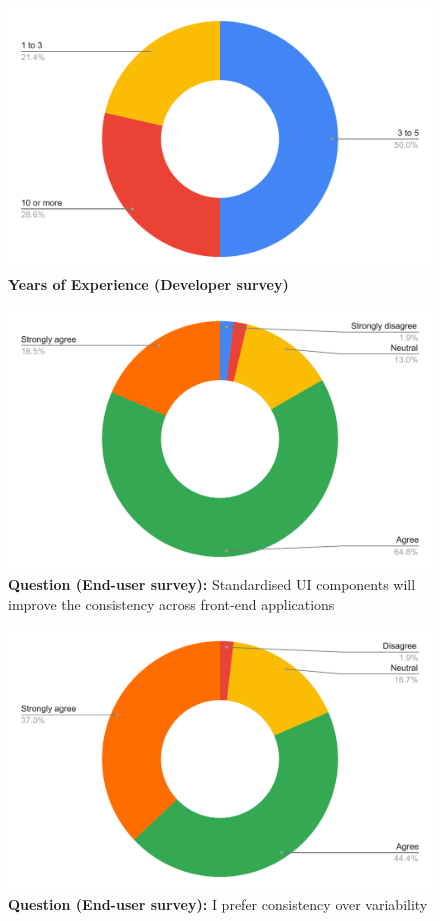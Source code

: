 \begin{figure}[H]
  \centering
  \includegraphics[width=13cm]{thesis/paper/images/p2d_experience.pdf}
  \textbf{Years of Experience (Developer survey)}
\end{figure}

\begin{figure}[H]
  \centering
  \includegraphics[width=13cm]{thesis/paper/images/p2u_q1.pdf}
  \textbf{Question (End-user survey):} Standardised UI components will improve the consistency across front-end applications
\end{figure}

\begin{figure}[H]
  \centering
  \includegraphics[width=13cm]{thesis/paper/images/p2u_q2.pdf}
  \textbf{Question (End-user survey):} I prefer consistency over variability
\end{figure}

